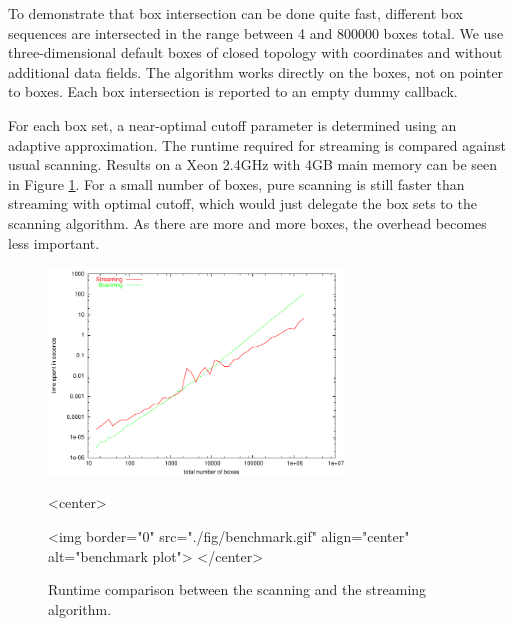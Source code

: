 To demonstrate that box intersection can be done quite fast, different
box sequences are intersected in the range between 4 and 800000 boxes
total.  We use three-dimensional default boxes of closed topology with
 coordinates and without additional data fields.  The
algorithm works directly on the boxes, not on pointer to boxes. Each
box intersection is reported to an empty dummy callback.

For each box set, a near-optimal cutoff parameter is determined using
an adaptive approximation. The runtime required for streaming is
compared against usual scanning.  Results on a Xeon 2.4GHz with 4GB
main memory can be seen in Figure \ref{fig_benchmark}. For a small
number of boxes, pure scanning is still faster than streaming with
optimal cutoff, which would just delegate the box sets to the scanning
algorithm. As there are more and more boxes, the overhead becomes less
important. 

\begin{figure}[htbp]
\begin{ccTexOnly}
\begin{center}
  \includegraphics[width=0.7\textwidth]{Box_intersection_d/fig/benchmark}
\end{center}
\end{ccTexOnly}
\begin{ccHtmlOnly}
<center>
\end{ccHtmlOnly}
  \caption{Runtime comparison between the scanning and the streaming algorithm.
  \label{fig_benchmark}}

\begin{ccHtmlOnly}
<img border="0" src="./fig/benchmark.gif" align="center" alt="benchmark plot">
</center>
\end{ccHtmlOnly}
\end{figure}

